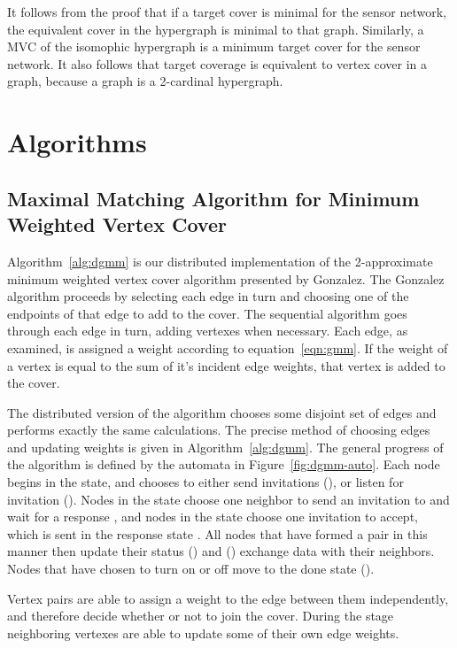

It follows from the proof that if a target cover is minimal for the sensor network, the equivalent cover in the hypergraph is minimal to that graph. Similarly, a MVC of the isomophic hypergraph is a minimum target cover for the sensor network. It also follows that target coverage is equivalent to vertex cover in a graph, because a graph is a 2-cardinal hypergraph.

\section{Algorithms}
\label{sec:algorithms}

\subsection{Maximal Matching Algorithm for Minimum Weighted Vertex Cover}
Algorithm~\ref{alg:dgmm} is our distributed implementation of the 2-approximate minimum weighted vertex cover algorithm presented by Gonzalez.\cite{Gonzalez1995129} The Gonzalez algorithm proceeds by selecting each edge in turn and choosing one of the endpoints of that edge to add to the cover. The sequential algorithm goes through each edge in turn, adding vertexes when necessary. Each edge, as examined, is assigned a weight according to equation~\ref{eqn:gmm}. If the weight of a vertex is equal to the sum of it's incident edge weights, that vertex is added to the cover. 



The distributed version of the algorithm chooses some disjoint set of edges and performs exactly the same calculations. The precise method of choosing edges and updating weights is given in Algorithm~\ref{alg:dgmm}. The general progress of the algorithm is defined by the automata in Figure~\ref{fig:dgmm-auto}. Each node begins in the \cCd state, and chooses to either send invitations (\cId), or listen for invitation (\cLd). Nodes in the \cId state choose one neighbor to send an invitation to and wait for a response \cWd, and nodes in the \cLd state choose one invitation to accept, which is sent in the response state \cRd. All nodes that have formed a pair in this manner then update their status (\cUd) and (\cEd) exchange data with their neighbors. Nodes that have chosen to turn on or off move to the done state (\cDd).  



Vertex pairs are able to assign a weight to the edge between them independently, and therefore decide whether or not to join the cover. During the \cEd stage neighboring vertexes are able to update some of their own edge weights. 

